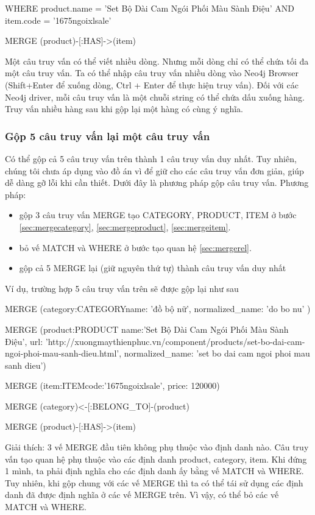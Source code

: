 WHERE  product.name = 'Set Bộ Dài Cam Ngói Phối Màu Sành Điệu' AND item.code = '1675ngoixlsale' 

MERGE (product)-[:HAS]->(item)

\bigskip

Một câu truy vấn có thể viết nhiều dòng. Nhưng mỗi dòng chỉ có thể chứa tối đa một câu truy vấn. Ta có thể nhập câu truy vấn nhiều dòng vào Neo4j Browser (Shift+Enter để xuống dòng, Ctrl + Enter để thực hiện truy vấn). Đối với các Neo4j driver, mỗi câu truy vấn là một chuỗi string có thể chứa dấu xuống hàng. Truy vấn nhiều hàng sau khi gộp lại một hàng có cùng ý nghĩa. 

\subsubsection{Gộp 5 câu truy vấn lại một câu truy vấn}
Có thể gộp cả 5 câu truy vấn trên thành 1 câu truy vấn duy nhất. Tuy nhiên, chúng tôi chưa áp dụng vào đồ án vì để giữ cho các câu truy vấn đơn giản, giúp dễ dàng gỡ lỗi khi cần thiết. Dưới đây là phương pháp gộp câu truy vấn. Phương pháp: 

\begin{itemize}
\item gộp 3 câu truy vấn MERGE tạo CATEGORY, PRODUCT, ITEM ở bước \ref{sec:mergecategory}, \ref{sec:mergeproduct}, \ref{sec:mergeitem}. 
\item bỏ vế MATCH và WHERE ở bước tạo quan hệ \ref{sec:mergerel}. 
\item gộp cả 5 MERGE lại (giữ nguyên thứ tự) thành câu truy vấn duy nhất 
\end{itemize} 

Ví dụ, trường hợp 5 câu truy vấn trên sẽ được gộp lại như sau

\medskip

MERGE (category:CATEGORY{name: 'đồ bộ nữ', normalized\_name: 'do bo nu' })

MERGE (product:PRODUCT{ name:'Set Bộ Dài Cam Ngói Phối Màu Sành Điệu', url: 'http://xuongmaythienphuc.vn/component/products/set-bo-dai-cam-ngoi-phoi-mau-sanh-dieu.html', normalized\_name: 'set bo dai cam ngoi phoi mau sanh dieu'})

MERGE (item:ITEM{code:'1675ngoixlsale', price: 120000})

MERGE (category)<-[:BELONG\_TO]-(product)

MERGE (product)-[:HAS]->(item)

\medskip

Giải thích: 3 vế MERGE đầu tiên không phụ thuộc vào định danh nào. Câu truy vấn tạo quan hệ phụ thuộc vào các định danh product, category, item. Khi đứng 1 mình, ta phải định nghĩa cho các định danh ấy bằng vế MATCH và WHERE. Tuy nhiên, khi gộp chung với các vế MERGE thì ta có thể tái sử dụng các định danh đã được định nghĩa ở các vế MERGE trên. Vì vậy, có thể bỏ các vế MATCH và WHERE. 

